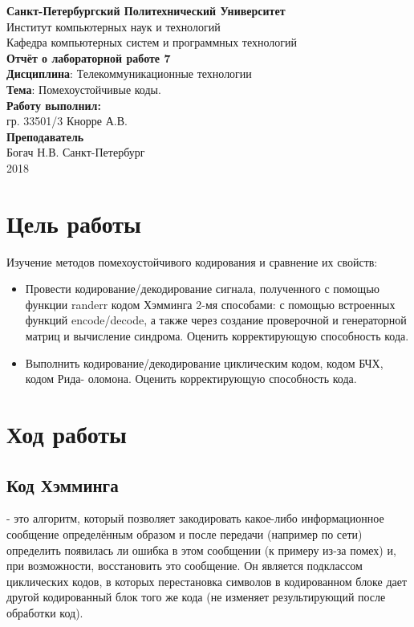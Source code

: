 \documentclass[a4paper,14pt]{extarticle}
\begin{document}
\begin{titlepage}
\centering 
{\bfseries Санкт-Петербургский Политехнический Университет} \\
Институт компьютерных наук и технологий \\
Кафедра компьютерных систем и программных технологий \\
\vspace{5cm}
{\centering \textbf{Отчёт о лабораторной работе 7} \\ 
\vspace{0.2cm}
\textbf{Дисциплина}: Телекоммуникационные технологии \\
\vspace{0.2cm}
\textbf{Тема}: Помехоустойчивые коды. } \\
\vspace{4cm}
\hfill {\bfseries Работу выполнил:}  \\
\hfill гр. 33501/3 Кнорре А.В. \\
\hfill {\bfseries Преподаватель}  \\
\hfill Богач Н.В.
\vfill
Санкт-Петербург \\
{\large 2018}
\end{titlepage}

\section{Цель работы}
Изучение методов помехоустойчивого кодирования и сравнение их свойств:
\begin{itemize}
\item Провести кодирование/декодирование сигнала, полученного с помощью функции randerr кодом Хэмминга 2-мя способами: с помощью встроенных функций encode/decode, а также через создание проверочной и генераторной матриц и вычисление синдрома. Оценить корректирующую способность кода. 
\item Выполнить кодирование/декодирование циклическим кодом, кодом БЧХ, кодом Рида- оломона. Оценить корректирующую способность кода.
\end{itemize}

\section{Ход работы}

\subsection{Код Хэмминга}
- это алгоритм, который позволяет закодировать какое-либо информационное сообщение определённым образом и после передачи (например по сети) определить появилась ли ошибка в этом сообщении (к примеру из-за помех) и, при возможности, восстановить это сообщение. Он является подклассом циклических кодов, в которых перестановка символов в кодированном блоке дает другой кодированный блок того же кода (не изменяет результирующий после обработки код).
\end{document}
